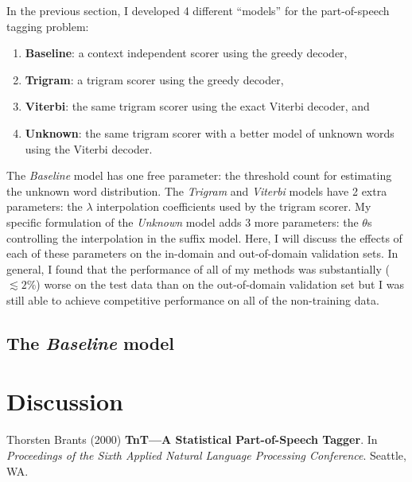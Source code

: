 \documentclass[11pt]{article}
\begin{document}
In the previous section, I developed 4 different ``models'' for the
part-of-speech tagging problem:
\begin{enumerate}
\item{{\bf Baseline}: a context independent scorer using the greedy
      decoder,}
\item{{\bf Trigram}: a trigram scorer using the greedy decoder,}
\item{{\bf Viterbi}: the same trigram scorer using the exact Viterbi decoder,
      and}
\item{{\bf Unknown}: the same trigram scorer with a better model of unknown
      words using the Viterbi decoder.}
\end{enumerate}
The \emph{Baseline} model has one free parameter: the threshold count for
estimating the unknown word distribution.
The \emph{Trigram} and \emph{Viterbi} models have 2 extra parameters: the
$\lambda$ interpolation coefficients used by the trigram scorer.
My specific formulation of the \emph{Unknown} model adds 3 more parameters:
the $\theta$s controlling the interpolation in the suffix model.
Here, I will discuss the effects of each of these parameters on the in-domain
and out-of-domain validation sets.
In general, I found that the performance of all of my methods was
substantially ($\lesssim 2\%$) worse on the test data than on the
out-of-domain validation set but I was still able to achieve competitive
performance on all of the non-training data.

\subsection{The \emph{Baseline} model}

\section{Discussion}

\begin{thebibliography}{}\raggedright

 Thorsten Brants (2000)
\textbf{TnT---A Statistical Part-of-Speech Tagger}.
In \emph{Proceedings of the Sixth Applied Natural Language Processing
Conference}. Seattle, WA.

\end{thebibliography}
\end{document}

